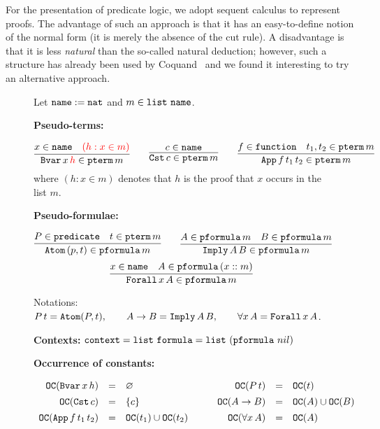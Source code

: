 \documentclass{svjour3}                     %
\newcommand{\seq}[2]{\infer{#2}{#1}}
\newcommand{\sing}[1]{\{ #1 \}}
\newcommand{\alert}[1]{\textcolor{red}{#1}}
\newcommand{\tApp}{\textup{\tt App}}
\newcommand{\tBvar}{\textup{\tt Bvar}}
\newcommand{\tCst}{\textup{\tt Cst}}
\newcommand{\tAtom}{\textup{\tt Atom}}
\newcommand{\tImply}{\textup{\tt Imply}}
\newcommand{\tForall}{\textup{\tt Forall}}
\newcommand{\tnat}{\textup{\tt name}}
\newcommand{\tfunction}{\textup{\tt function}}
\newcommand{\tpredicate}{\textup{\tt predicate}}
\newcommand{\tpterm}{\textup{\tt pterm}}
\newcommand{\tpfml}{\textup{\tt pformula}}
\newcommand{\tfml}{\textup{\tt formula}}
\newcommand{\tcontext}{\textup{\tt context}}
\newcommand{\tOC}{\textup{\tt OC}}
\newcommand{\tlist}{\textup{\tt list}}
\begin{document}
For the presentation of predicate logic, we adopt sequent calculus to represent proofs. The advantage of such an approach is that it has an easy-to-define notion of the normal form (it is merely the absence of the cut rule). A disadvantage is that it is less \textit{natural} than the so-called natural deduction; however, such a structure has already been used by Coquand~\cite{cCoquand93} and we found it interesting to try an alternative approach.

\begin{figure}[t]
Let $\tnat := \tt{nat}$ and $m \in \tlist \,\,\tnat$.\medskip

\textbf{Pseudo-terms:} 

\[
\vcenter{\seq{x \in \tnat & \alert{(h: x \in m)}}{\tBvar\, x\, \alert{h} \in \tpterm \, m}}
\qquad
\vcenter{\seq{c \in \tnat}{\tCst \, c \in \tpterm\, m}}
\qquad
\vcenter{\seq{f \in \tfunction & t_1, t_2\in \tpterm\, m}{\tApp\, f\, t_1\, t_2 \in \tpterm\, m}}
\]
where $(h:x \in m)$ denotes that $h$ is the proof that $x$ occurs in the list $m$.\medskip

\textbf{Pseudo-formulae:}

 \[
  \seq{P\in \tpredicate & t \in \tpterm\, m}{\tAtom \, (p, t) \in \tpfml \, m}\qquad
  \seq{A \in \tpfml\, m & B \in \tpfml \, m}{\tImply\, A\, B \in \tpfml\, m}
  \]
  \[
  \seq{x \in \tnat & A \in \tpfml \, (x :: m)}{\tForall\, x\, A \in \tpfml\, m}
  \]

Notations: $P\, t = \tAtom(P, t), \qquad A \to B = \tImply\, A\, B, \qquad \forall x\, A = \tForall\, x\, A$. \medskip

\textbf{Contexts:} $\tcontext = \tlist\,\, \tfml = \tlist\,\, (\tpfml\,\, nil)$\medskip

\textbf{Occurrence of constants:}

\[
\begin{array}{rcl}
  \tOC(\tBvar\, x\, h) & = & \varnothing\\[1ex]
  \tOC(\tCst\, c) & = & \sing{c}\\[1ex]
  \tOC(\tApp\, f\, t_1\, t_2) & = & \tOC(t_1) \cup \tOC(t_2)
\end{array} \qquad
\begin{array}{rcl}
  \tOC(P\, t) & = & \tOC(t)\\[1ex]
  \tOC(A \to B) & = & \tOC(A) \cup \tOC(B)\\[1ex]
  \tOC(\forall x\, A) & = & \tOC(A)
\end{array}
\]


\end{figure}
\end{document}
